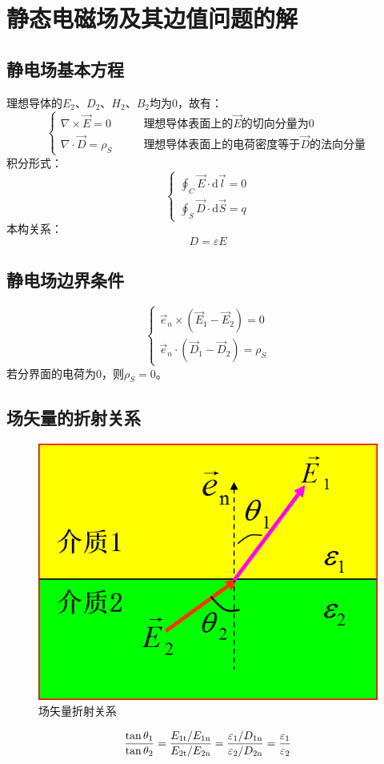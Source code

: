 \chapter{静态电磁场及其边值问题的解}

\section{静电场基本方程}
理想导体的$E_2$、$D_2$、$H_2$、$B_2$均为0，故有：
$$\left\{
\begin{aligned}
\nabla \times \vec{E} = 0 &\qquad\text{理想导体表面上的}\vec{E}\text{的切向分量为0}\\
\nabla \cdot \vec{D} = \rho_S&\qquad\text{理想导体表面上的电荷密度等于}\vec{D}\text{的法向分量}
\end{aligned}
\right.$$
积分形式：
$$\left\{
\begin{aligned}
\oint_C \vec{E} \cdot \mathrm{d}\vec{l} = 0\\
\oint_S \vec{D} \cdot \mathrm{d}\vec{S} = q
\end{aligned}
\right.$$
本构关系：
$$D = \varepsilon E$$

\section{静电场边界条件}
$$\left\{
\begin{aligned}
	\vec{e}_n \times (\vec{E}_1 - \vec{E}_2) = 0 \\
	\vec{e}_n \cdot (\vec{D}_1 - \vec{D}_2) = \rho_S
\end{aligned}
\right.$$
若分界面的电荷为0，则$\rho_S = 0$。

\section{场矢量的折射关系}
\begin{figure}[h]
	\centering
	\includegraphics[keepaspectratio]{pics/场矢量折射关系}
	\caption{场矢量折射关系}
	\label{fig:fieldrefraction}
\end{figure}
$${{\tan {\theta _1}} \over {\tan {\theta _2}}} = {{{E_{{\rm{1t}}}}/{E_{{\rm{1n}}}}} \over {{E_{{\rm{2t}}}}/{E_{{\rm{2n}}}}}} = {{{\varepsilon _{\rm{1}}}/{D_{{\rm{1n}}}}} \over {{\varepsilon _{\rm{2}}}/{D_{{\rm{2n}}}}}} = {{{\varepsilon _1}} \over {{\varepsilon _2}}}$$



